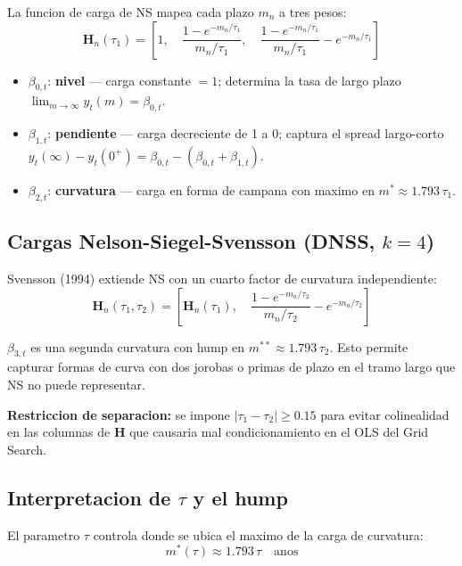\documentclass[12pt, a4paper]{article}
\theoremstyle{plain}
\theoremstyle{definition}
\theoremstyle{remark}
\newcommand{\bH}{\mathbf{H}}
\begin{document}
La funcion de carga de NS mapea cada plazo $m_n$ a tres pesos:
\begin{equation}
  \bH_n(\tau_1) = \left[
    1,\quad
    \frac{1-e^{-m_n/\tau_1}}{m_n/\tau_1},\quad
    \frac{1-e^{-m_n/\tau_1}}{m_n/\tau_1} - e^{-m_n/\tau_1}
  \right]
  \label{eq:ns}
\end{equation}

\begin{itemize}[leftmargin=1.5em, itemsep=2pt]
  \item $\beta_{0,t}$: \textbf{nivel} --- carga constante $=1$;
        determina la tasa de largo plazo $\lim_{m\to\infty}y_t(m)=\beta_{0,t}$.
  \item $\beta_{1,t}$: \textbf{pendiente} --- carga decreciente de 1 a 0;
        captura el spread largo-corto $y_t(\infty) - y_t(0^+) = \beta_{0,t} - (\beta_{0,t}+\beta_{1,t})$.
  \item $\beta_{2,t}$: \textbf{curvatura} --- carga en forma de campana con
        maximo en $m^* \approx 1.793\,\tau_1$.
\end{itemize}

\subsection{Cargas Nelson-Siegel-Svensson (DNSS, $k=4$)}

Svensson (1994) extiende NS con un cuarto factor de curvatura independiente:
\begin{equation}
  \bH_n(\tau_1,\tau_2) = \left[
    \bH_n(\tau_1),\quad
    \frac{1-e^{-m_n/\tau_2}}{m_n/\tau_2} - e^{-m_n/\tau_2}
  \right]
  \label{eq:nss}
\end{equation}

$\beta_{3,t}$ es una segunda curvatura con hump en $m^{**} \approx 1.793\,\tau_2$.
Esto permite capturar formas de curva con dos jorobas o primas de plazo
en el tramo largo que NS no puede representar.

\textbf{Restriccion de separacion:} se impone $|\tau_1 - \tau_2| \geq 0.15$
para evitar colinealidad en las columnas de $\bH$ que causaria mal
condicionamiento en el OLS del Grid Search.

\subsection{Interpretacion de $\tau$ y el hump}

El parametro $\tau$ controla donde se ubica el maximo de la carga de curvatura:
\begin{equation}
  m^*(\tau) \approx 1.793\,\tau \quad \text{anos}
  \label{eq:hump}
\end{equation}
\end{document}
